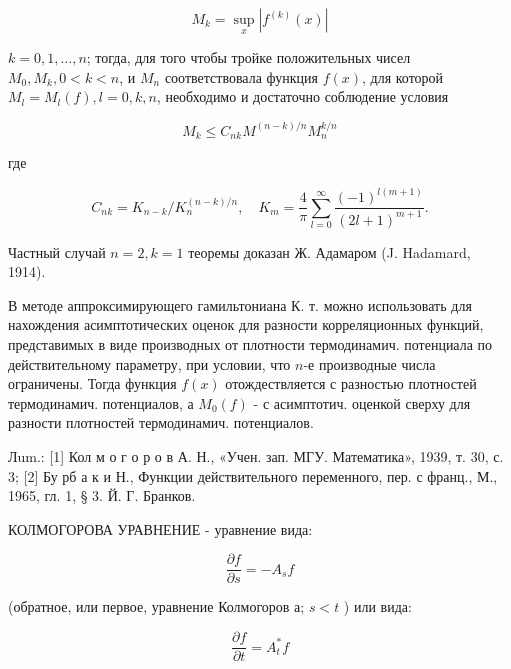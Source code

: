 \documentclass[10pt]{article}
\begin{document}
\[

M_{k}=\sup _{x}\left|f^{(k)}(x)\right|

\]



$k=0,1, \ldots, n$; тогда, для того чтобы тройке положительных чисел $M_{0}, M_{k}, 0<k<n$, и $M_{n}$ соответствовала функция $f(x)$, для которой $M_{l}=M_{l}(f), l=0, k, n$, необходимо и достаточно соблюдение условия



\[

M_{k} \leqslant C_{n k} M^{(n-k) / n} M_{n}^{k / n}

\]



где



\[

C_{n k}=K_{n-k} / K_{n}^{(n-k) / n}, \quad K_{m}=\frac{4}{\pi} \sum_{l=0}^{\infty} \frac{(-1)^{l(m+1)}}{(2 l+1)^{m+1}} .

\]



Частный случай $n=2, k=1$ теоремы доказан Ж. Адамаром (J. Hadamard, 1914).



В методе аппроксимирующего гамильтониана К. т. можно использовать для нахождения асимптотических оценок для разности корреляционных функций, представимых в виде производных от плотности термодинамич. потенциала по действительному параметру, при условии, что $n$-е производные числа ограничены. Тогда функция $f(x)$ отождествляется с разностью плотностей термодинамич. потенциалов, а $M_{0}(f)$ - с асимптотич. оценкой сверху для разности плотностей термодинамич. потенциалов.



Лum.: [1] Кол м о г о р о в А. Н., «Учен. зап. МГУ. Математика», 1939, т. 30, с. 3; [2] Бу рб а к и Н., Функции действительного переменного, пер. с франц., М., 1965, гл. 1, § 3. Й. Г. Бранков.



КОЛМОГОРОВА УРАВНЕНИЕ - уравнение вида:



\[

\frac{\partial f}{\partial s}=-A_{s} f

\]



(обратное, или первое, уравнение Колмогоров а; $s<t$ ) или вида:



\[

\frac{\partial f}{\partial t}=A_{t}^{*} f

\]
\end{document}
